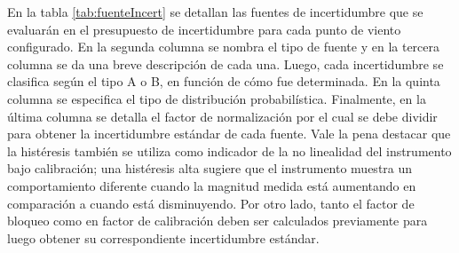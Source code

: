 En la tabla \ref{tab:fuenteIncert} se detallan las fuentes de incertidumbre que se evaluarán en el presupuesto de incertidumbre para cada punto de viento configurado. En la segunda columna se nombra el tipo de fuente y en la tercera columna se da una breve descripción de cada una. Luego, cada incertidumbre se clasifica según el tipo A o B, en función de cómo fue determinada. En la quinta columna se especifica el tipo de distribución probabilística. Finalmente, en la última columna se detalla el factor de normalización por el cual se debe dividir para obtener la incertidumbre estándar de cada fuente. Vale la pena destacar que la histéresis también se utiliza como indicador de la no linealidad del instrumento bajo calibración; una histéresis alta sugiere que el instrumento muestra un comportamiento diferente cuando la magnitud medida está aumentando en comparación a cuando está disminuyendo. Por otro lado, tanto el factor de bloqueo como en factor de calibración deben ser calculados previamente para luego obtener su correspondiente incertidumbre estándar.




